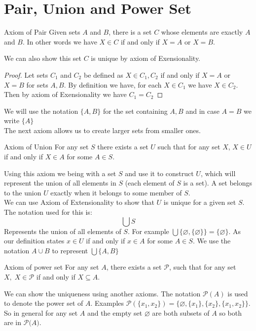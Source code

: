 \documentclass[16pt,a4paper]{article}
\let\emptyset\varnothing
\theoremstyle{definition}
\begin{document}
\section{Pair, Union and Power Set}

\begin{axm}{Axiom of Pair}{}
 Given sets $A$ and $B$, there is a set $C$ whose elements are exactly $A$ and $B$. In other words we have $X\in C$ if and only if $X=A$ or $X=B$. 
\end{axm}
We can also show this set $C$ is unique by axiom of Exensionality. 
\begin{proof}
Let sets $C_1$ and $C_2$ be defined as $X\in C_1, C_2$ if and only if $X = A$ or $X=B$ for sets $A,B$. By definition we have,  for each $X\in C_1$ we have $X\in C_2$. Then by axiom of Exensionality we have $C_1 = C_2$
\end{proof}
We will use the notation $\{A,B\}$ for the set containing $A,B$ and in case $A=B$ we write $\{A\}$\\
The next axiom allows us to create larger sets from smaller ones.\\
 
 \newpage

 \begin{axm}{Axiom of Union}{}
 For any set $S$ there exists a set $U$ such that for any set $X$, $X\in U$ if and only if $X\in A$ for some $A\in S$. \end{axm}
Using this axiom we being with a set $S$ and use it to construct $U$, which will represent the union of all elements in $S$ (each element of $S$ is a set). A set belongs to the union $U$ exactly when it belongs to some member of $S$. \\
We can use Axiom of Extensionality to show that $U$ is unique for a given set $S$. The notation used for this is:
 \[\bigcup S\]
Represents the union of all elements of $S$. For example $\bigcup \{\emptyset, \{\emptyset\}\} = \{\emptyset\}$. As our definition states $x\in U$ if and only if $x\in A$ for some $A\in S$. We use the notation $A\cup B$ to represent $\bigcup\{A,B\}$

\begin{axm}{Axiom of power set}{}
For any set $A$, there exists a set $\mathcal{P}$, such that for any set $X, \; X\in \mathcal{P}$ if and only if $X\subseteq A$. 
\end{axm}
We can show the uniqueness using another axioms. The notation $\mathcal{P}(A)$ is used to denote the power set of $A$.  
Examples $\mathcal{P}(\{x_1, x_2\}) = \{\emptyset, \{x_1\}, \{x_2\}, \{x_1, x_2\}\}$. So in general for any set $A$ and the empty set $\emptyset$ are both subsets of $A$ so both are in $\mathcal{P(}A)$. \\
\end{document}
